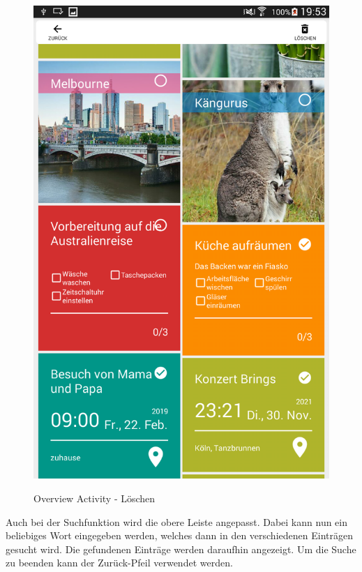\begin{figure}[H]
\centering
\begin{minipage}[t]{1\textwidth} %
\caption{Overview Activity - Löschen} %
\includegraphics[width=1\textwidth]{img/Loeschen}\\ %
\end{minipage}
\end{figure}

Auch bei der Suchfunktion wird die obere Leiste angepasst. Dabei kann nun ein beliebiges Wort eingegeben werden, welches dann in den verschiedenen Einträgen gesucht wird. Die gefundenen Einträge werden daraufhin angezeigt. Um die Suche zu beenden kann der Zurück-Pfeil verwendet werden.

